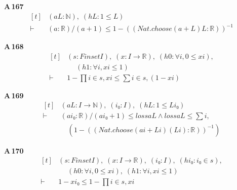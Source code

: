 \noindent\textbf{A\,167}\quad{}
{\footnotesize\[ \begin{aligned}[t]
&(\mathit{a} \mathit{L} : \mathbb{N} ),\; (\mathit{hL} : 1 \leq \mathit{L})\\
\vdash\;&(\mathit{a} : \mathbb{R} ) / (\mathit{a} + 1) \leq 1 - ((\mathit{Nat}.\mathit{choose} (\mathit{a} + \mathit{L}) \mathit{L} : \mathbb{R} ))^{-1}
\end{aligned} \]}

\noindent\textbf{A\,168}\quad{}
{\footnotesize\[ \begin{aligned}[t]
&(\mathit{s} : \mathit{Finset} \mathit{I}),\; (\mathit{x} : \mathit{I} \to \mathbb{R} ),\; (\mathit{h0} : \forall \mathit{i}, 0 \leq \mathit{x} \mathit{i}),\\
&\quad \; (\mathit{h1} : \forall \mathit{i}, \mathit{x} \mathit{i} \leq 1)\\
\vdash\;&1 - \textstyle\prod \mathit{i} \in \mathit{s}, \mathit{x} \mathit{i} \leq \textstyle\sum \mathit{i} \in \mathit{s}, (1 - \mathit{x} \mathit{i})
\end{aligned} \]}

\noindent\textbf{A\,169}\quad{}
{\footnotesize\[ \begin{aligned}[t]
&(\mathit{a} \mathit{L} : \mathit{I} \to \mathbb{N} ),\; (\mathit{i₀} : \mathit{I}),\; (\mathit{hL} : 1 \leq \mathit{L} \mathit{i₀})\\
\vdash\;&(\mathit{a} \mathit{i₀} : \mathbb{R} ) / (\mathit{a} \mathit{i₀} + 1) \leq \mathit{loss} \mathit{a} \mathit{L} \wedge \mathit{loss} \mathit{a} \mathit{L} \leq \textstyle\sum \mathit{i},\\
&\quad (1 - ((\mathit{Nat}.\mathit{choose} (\mathit{a} \mathit{i} + \mathit{L} \mathit{i}) (\mathit{L} \mathit{i}) : \mathbb{R} ))^{-1} )
\end{aligned} \]}

\noindent\textbf{A\,170}\quad{}
{\footnotesize\[ \begin{aligned}[t]
&(\mathit{s} : \mathit{Finset} \mathit{I}),\; (\mathit{x} : \mathit{I} \to \mathbb{R} ),\; (\mathit{i₀} : \mathit{I}),\; (\mathit{hi₀} : \mathit{i₀} \in \mathit{s}),\\
&\quad \; (\mathit{h0} : \forall \mathit{i}, 0 \leq \mathit{x} \mathit{i}),\; (\mathit{h1} : \forall \mathit{i}, \mathit{x} \mathit{i} \leq 1)\\
\vdash\;&1 - \mathit{x} \mathit{i₀} \leq 1 - \textstyle\prod \mathit{i} \in \mathit{s}, \mathit{x} \mathit{i}
\end{aligned} \]}

